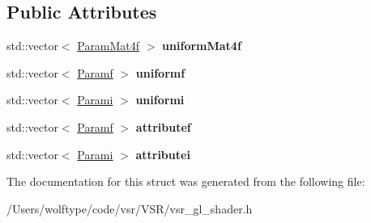 \subsection*{Public Attributes}
\begin{DoxyCompactItemize}
\item 
\hypertarget{structvsr_1_1_shader_data_ab80fa0a4fff9a4b3d3fc7b5daae8fa55}{std\-::vector$<$ \hyperlink{structvsr_1_1_shader_data_1_1_param_mat4f}{Param\-Mat4f} $>$ {\bfseries uniform\-Mat4f}}\label{structvsr_1_1_shader_data_ab80fa0a4fff9a4b3d3fc7b5daae8fa55}

\item 
\hypertarget{structvsr_1_1_shader_data_a5f2e06ae25f73f0cec20b870c52139fc}{std\-::vector$<$ \hyperlink{structvsr_1_1_shader_data_1_1_paramf}{Paramf} $>$ {\bfseries uniformf}}\label{structvsr_1_1_shader_data_a5f2e06ae25f73f0cec20b870c52139fc}

\item 
\hypertarget{structvsr_1_1_shader_data_a20dc5ee050a34f849770a4388daedc98}{std\-::vector$<$ \hyperlink{structvsr_1_1_shader_data_1_1_parami}{Parami} $>$ {\bfseries uniformi}}\label{structvsr_1_1_shader_data_a20dc5ee050a34f849770a4388daedc98}

\item 
\hypertarget{structvsr_1_1_shader_data_a11f673bcdd318da3c68cfd8aa844ae7b}{std\-::vector$<$ \hyperlink{structvsr_1_1_shader_data_1_1_paramf}{Paramf} $>$ {\bfseries attributef}}\label{structvsr_1_1_shader_data_a11f673bcdd318da3c68cfd8aa844ae7b}

\item 
\hypertarget{structvsr_1_1_shader_data_a5900a894dba9c9950ad679f0ac5b6485}{std\-::vector$<$ \hyperlink{structvsr_1_1_shader_data_1_1_parami}{Parami} $>$ {\bfseries attributei}}\label{structvsr_1_1_shader_data_a5900a894dba9c9950ad679f0ac5b6485}

\end{DoxyCompactItemize}


The documentation for this struct was generated from the following file\-:\begin{DoxyCompactItemize}
\item 
/\-Users/wolftype/code/vsr/\-V\-S\-R/vsr\-\_\-gl\-\_\-shader.\-h\end{DoxyCompactItemize}
